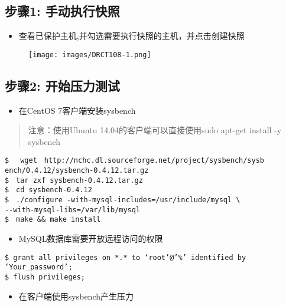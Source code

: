 \subsection{步骤1: 手动执行快照}
\label{步骤1:手动执行快照}

\begin{itemize}
\item 查看已保护主机,并勾选需要执行快照的主机，并点击创建快照

\end{itemize}

\begin{figure}[htbp]
\centering
\texttt{[image: images/DRCT108-1.png]}
\end{figure}

\subsection{步骤2: 开始压力测试}
\label{步骤2:开始压力测试}

\begin{itemize}
\item 在CentOS 7客户端安装sysbench

\end{itemize}

\begin{quote}

注意：使用Ubuntu 14.04的客户端可以直接使用sudo apt-get install -y sysbench
\end{quote}

\begin{verbatim}
$ 　wget　http://nchc.dl.sourceforge.net/project/sysbench/sysb
ench/0.4.12/sysbench-0.4.12.tar.gz
$　tar zxf sysbench-0.4.12.tar.gz
$　cd sysbench-0.4.12
$　./configure -with-mysql-includes=/usr/include/mysql \
--with-mysql-libs=/var/lib/mysql
$　make && make install
\end{verbatim}

\begin{itemize}
\item MySQL数据库需要开放远程访问的权限

\end{itemize}

\begin{verbatim}
$ grant all privileges on *.* to ‘root’@’%’ identified by ‘Your_password’;
$ flush privileges; 
\end{verbatim}

\begin{itemize}
\item 在客户端使用sysbench产生压力

\end{itemize}

